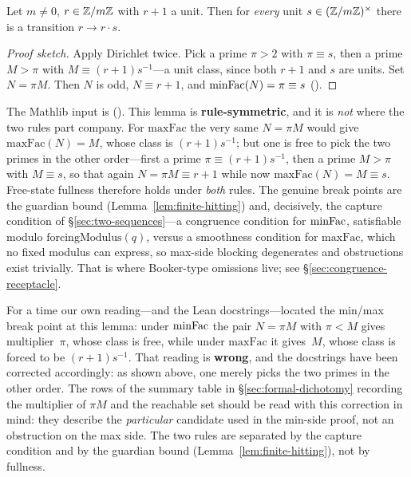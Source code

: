 \begin{lemma}
\label{lem:free-transition}
Let $m \neq 0$, $r \in \mathbb{Z}/m\mathbb{Z}$ with $r+1$ a unit.  Then for
\emph{every} unit $s \in (\mathbb{Z}/m\mathbb{Z})^\times$ there is a transition
$r \to r\cdot s$.
\end{lemma}

\begin{proof}[Proof sketch]
Apply Dirichlet twice.  Pick a prime $\pi > 2$ with $\pi \equiv s$, then
a prime $M > \pi$ with $M \equiv (r+1)s^{-1}$---a unit class, since both
$r+1$ and $s$ are units.  Set $N = \pi M$.  Then $N$ is odd,
$N \equiv r+1$, and $\mathrm{minFac}(N) = \pi \equiv s$
().
\end{proof}

\noindent
The Mathlib input is
().
This lemma is \textbf{rule-symmetric}, and it is \emph{not} where the
two rules part company.  For $\mathrm{maxFac}$ the very same
$N = \pi M$ would give $\mathrm{maxFac}(N) = M$, whose class is
$(r+1)s^{-1}$; but one is free to pick the two primes in the other
order---first a prime $\pi \equiv (r+1)s^{-1}$, then a prime
$M > \pi$ with $M \equiv s$, so that again $N = \pi M \equiv r+1$
while now $\mathrm{maxFac}(N) = M \equiv s$.  Free-state fullness
therefore holds under \emph{both} rules.  The genuine break points are
the guardian bound (Lemma~\ref{lem:finite-hitting}) and, decisively,
the capture condition of \S\ref{sec:two-sequences}---a congruence
condition for $\mathrm{minFac}$, satisfiable modulo
$\mathrm{forcingModulus}(q)$, versus a smoothness condition for
$\mathrm{maxFac}$, which no fixed modulus can express, so max-side
blocking degenerates and obstructions exist trivially.  That is where
Booker-type omissions live; see
\S\ref{sec:congruence-receptacle}.

\begin{remark}
\label{rem:fullness-symmetric}
For a time our own reading---and the Lean docstrings---located the
min/max break point at this lemma: under $\mathrm{minFac}$ the pair
$N = \pi M$ with $\pi < M$ gives multiplier~$\pi$, whose class is
free, while under $\mathrm{maxFac}$ it gives~$M$, whose class is
forced to be $(r{+}1)s^{-1}$.  That reading is \textbf{wrong}, and
the docstrings have been corrected accordingly: as shown above, one
merely picks the two primes in the other order.  The rows of the
summary table in \S\ref{sec:formal-dichotomy} recording the
multiplier of $\pi M$ and the reachable set should be read with this
correction in mind: they describe the \emph{particular} candidate
used in the min-side proof, not an obstruction on the max side.  The
two rules are separated by the capture condition and by the guardian
bound (Lemma~\ref{lem:finite-hitting}), not by fullness.
\end{remark}

